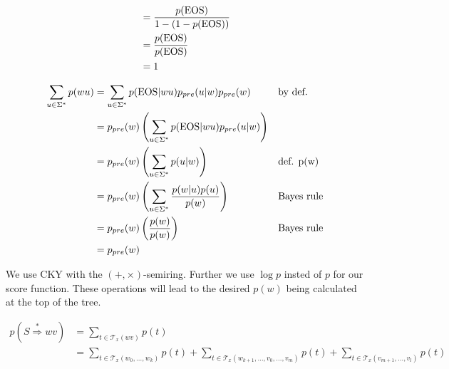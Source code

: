 \documentclass[a4paper,12pt]{ETHexercise}
\begin{document}
\begin{question}
\begin{subquestion}
\begin{align}
			                           & = \frac{p(\text{EOS})}{1 - (1-p(\text{EOS}))}                                                                                                                                                                              \\
			                           & = \frac{p(\text{EOS})}{p(\text{EOS})}                                                                                                                                                                                      \\
			                           & = 1
		\end{align}
	\end{subquestion}
	\begin{subquestion}
		\begin{align}
			\sum_{u \in \Sigma^*} p(wu) & = \sum_{u \in \Sigma^*} p(\text{EOS} | wu) p_{pre}(u|w)p_{pre}(w)                &  & \text{by def.}    \\
			                            & = p_{pre}(w) \left( \sum_{u \in \Sigma^*} p(\text{EOS} | wu) p_{pre}(u|w)\right)                        \\
			                            & = p_{pre}(w) \left( \sum_{u \in \Sigma^*}p(u | w) \right)                  &  & \text{def. p(w)}  \\
			                            & = p_{pre}(w) \left( \sum_{u \in \Sigma^*} \frac{p(w|u)p(u)}{p(w)} \right)  &  & \text{Bayes rule} \\
			                            & = p_{pre}(w) \left( \frac{p(w)}{p(w)}\right)                               &  & \text{Bayes rule} \\
			                            & = p_{pre}(w)
		\end{align}
	\end{subquestion}
	\begin{subquestion}
		We use CKY with the $(+, \times)$-semiring. Further we use $\log p$ insted of $p$ for our score function. These operations will lead to the desired $p(w)$ being calculated at the top of the tree.
	\end{subquestion}
	\begin{subquestion}
		\begin{align}
			p(S \overset{*}{\Rightarrow} wv) & = \sum_{t \in \mathcal{T}_x(wv)} p(t)                                                                                                                                        \\
			                                 & = \sum_{t \in \mathcal{T}_x(w_0, \dots, w_k)} p(t) + \sum_{t \in \mathcal{T}_x(w_{k+1}, \dots, v_0, \dots, v_m)} p(t) + \sum_{t \in \mathcal{T}_x(v_{m+1}, \dots, v_l)} p(t) \\

\end{align}
\end{subquestion}
\end{question}
\end{document}
